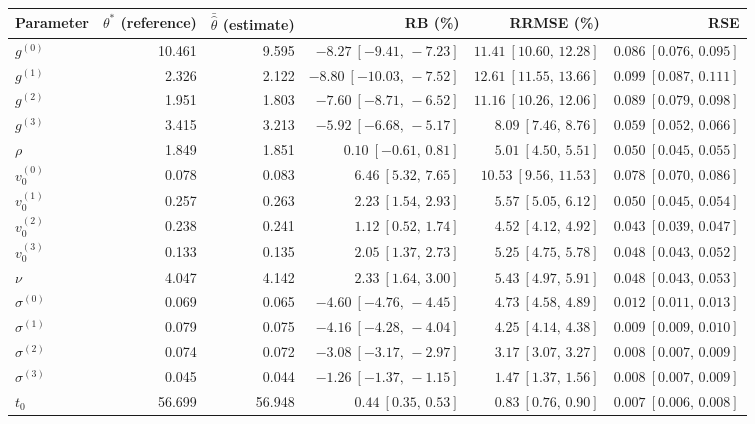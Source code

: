 \documentclass{rapportCS}
\begin{document}
\begin{table}[htbp]
\centering
\footnotesize 
\setlength{\tabcolsep}{3.5pt}
\begin{tabular}{lrrrrr}
Parameter & $\theta^{*}$ (reference) & $\bar{\hat{\theta}}$ (estimate) & RB (\%) & RRMSE (\%) & RSE \\
\hline
$g^{(0)}$      & 10.461 & 9.595  & $-8.27\ [-9.41,\,-7.23]$  & $11.41\ [10.60,\,12.28]$ & $0.086\ [0.076,\,0.095]$ \\
$g^{(1)}$      & 2.326  & 2.122  & $-8.80\ [-10.03,\,-7.52]$ & $12.61\ [11.55,\,13.66]$ & $0.099\ [0.087,\,0.111]$ \\
$g^{(2)}$      & 1.951  & 1.803  & $-7.60\ [-8.71,\,-6.52]$  & $11.16\ [10.26,\,12.06]$ & $0.089\ [0.079,\,0.098]$ \\
$g^{(3)}$      & 3.415  & 3.213  & $-5.92\ [-6.68,\,-5.17]$  & $8.09\ [7.46,\,8.76]$    & $0.059\ [0.052,\,0.066]$ \\
$\rho$         & 1.849  & 1.851  & $0.10\ [-0.61,\,0.81]$    & $5.01\ [4.50,\,5.51]$    & $0.050\ [0.045,\,0.055]$ \\
$v_0^{(0)}$   & 0.078  & 0.083  & $6.46\ [5.32,\,7.65]$     & $10.53\ [9.56,\,11.53]$  & $0.078\ [0.070,\,0.086]$ \\
$v_0^{(1)}$   & 0.257  & 0.263  & $2.23\ [1.54,\,2.93]$     & $5.57\ [5.05,\,6.12]$    & $0.050\ [0.045,\,0.054]$ \\
$v_0^{(2)}$   & 0.238  & 0.241  & $1.12\ [0.52,\,1.74]$     & $4.52\ [4.12,\,4.92]$    & $0.043\ [0.039,\,0.047]$ \\
$v_0^{(3)}$   & 0.133  & 0.135  & $2.05\ [1.37,\,2.73]$     & $5.25\ [4.75,\,5.78]$    & $0.048\ [0.043,\,0.052]$ \\
$\nu$          & 4.047  & 4.142  & $2.33\ [1.64,\,3.00]$     & $5.43\ [4.97,\,5.91]$    & $0.048\ [0.043,\,0.053]$ \\
$\sigma^{(0)}$ & 0.069  & 0.065  & $-4.60\ [-4.76,\,-4.45]$  & $4.73\ [4.58,\,4.89]$    & $0.012\ [0.011,\,0.013]$ \\
$\sigma^{(1)}$ & 0.079  & 0.075  & $-4.16\ [-4.28,\,-4.04]$  & $4.25\ [4.14,\,4.38]$    & $0.009\ [0.009,\,0.010]$ \\
$\sigma^{(2)}$ & 0.074  & 0.072  & $-3.08\ [-3.17,\,-2.97]$  & $3.17\ [3.07,\,3.27]$    & $0.008\ [0.007,\,0.009]$ \\
$\sigma^{(3)}$ & 0.045  & 0.044  & $-1.26\ [-1.37,\,-1.15]$  & $1.47\ [1.37,\,1.56]$    & $0.008\ [0.007,\,0.009]$ \\
$t_0$          & 56.699 & 56.948 & $0.44\ [0.35,\,0.53]$     & $0.83\ [0.76,\,0.90]$    & $0.007\ [0.006,\,0.008]$ \\

\end{tabular}
\end{table}
\end{document}
